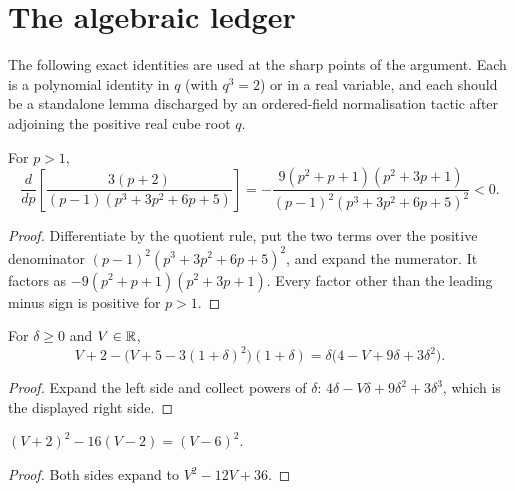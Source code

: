 \section{The algebraic ledger}\label{sec:ledger}

The following exact identities are used at the sharp points of the argument.
Each is a polynomial identity in $q$ (with $q^3=2$) or in a real variable, and
each should be a standalone lemma discharged by an ordered-field normalisation
tactic after adjoining the positive real cube root $q$.

\begin{lemma}\label{lem:ledger-Fprime}
For $p>1$,
\begin{equation}\label{eq:ledger-Fprime}
  \frac{d}{dp}\left[\frac{3(p+2)}{(p-1)(p^3+3p^2+6p+5)}\right]
  =-\frac{9(p^2+p+1)(p^2+3p+1)}{(p-1)^2(p^3+3p^2+6p+5)^2}<0 .
\end{equation}
\end{lemma}

\begin{proof}
Differentiate by the quotient rule, put the two terms over the positive
denominator
$(p-1)^2(p^3+3p^2+6p+5)^2$, and expand the numerator.  It factors as
$-9(p^2+p+1)(p^2+3p+1)$.  Every factor other than the leading minus sign is
positive for $p>1$.
\end{proof}

\begin{lemma}\label{lem:ledger-oneball}
For $\delta\ge0$ and $V\in\mathbb R$,
\begin{equation}\label{eq:ledger-oneball}
  V+2-\bigl(V+5-3(1+\delta)^2\bigr)(1+\delta)
  =\delta\bigl(4-V+9\delta+3\delta^2\bigr).
\end{equation}
\end{lemma}

\begin{proof}
Expand the left side and collect powers of $\delta$:
$4\delta-V\delta+9\delta^2+3\delta^3$, which is the displayed right side.
\end{proof}

\begin{lemma}[The $V=6$ discriminant]\label{lem:ledger-six}
$(V+2)^2-16(V-2)=(V-6)^2$.
\end{lemma}

\begin{proof}
Both sides expand to $V^2-12V+36$.
\end{proof}

